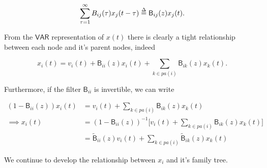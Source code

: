 \documentclass[12pt]{article}
\def\gcg{\mathcal{G}}  %
\def\VAR{\mathsf{VAR}}  %
\def\B{\mathsf{B}}  %
\def\wtB{\widetilde{\B}}  %
\newcommand{\pa}[1]{pa(#1)}  %
\begin{document}
\begin{equation}
  \sum_{\tau = 1}^\infty B_{ij}(\tau)x_j(t - \tau) \defeq \B_{ij}(z)x_j(t).
\end{equation}


From the $\VAR$ representation of $x(t)$ there is clearly a tight
relationship between each node and it's parent nodes, indeed

\begin{equation}
  \label{eqn:parent_expanion}
  x_i(t) = v_i(t) + \B_{ii}(z)x_i(t) + \sum_{k \in \pa{i}}\B_{ik}(z)x_k(t).
\end{equation}

Furthermore, if the filter $\B_{ii}$ is invertible, we can write

\begin{equation*}
  \begin{aligned}
    (1 - \B_{ii}(z))x_i(t) &= v_i(t) + \sum_{k \in \pa{i}}\B_{ik}(z)x_k(t)\\
    \implies x_i(t) &= (1 - \B_{ii}(z))^{-1}\big[v_i(t) + \sum_{k \in \pa{i}}\B_{ik}(z)x_k(t)\big]\\
    &= \wtB_{ii}(z)v_i(t) + \sum_{k \in \pa{i}}\wtB_{ik}(z)x_k(t)
  \end{aligned}
\end{equation*}


We continue to develop the relationship between $x_i$ and it's family tree.
\end{document}

